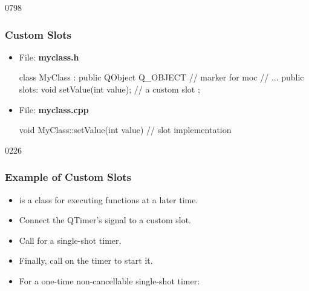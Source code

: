 
\begin{slide}[fragile]{0798}\frametitle{Custom Slots}
 \label{codeForSlots1}
\begin{itemize}
\item File: \textbf{myclass.h} 
  \begin{cpp}
class MyClass : public QObject 
{
  Q_OBJECT // marker for moc
  // ...
public slots:
  void setValue(int value); // a custom slot
};
  \end{cpp}
\item File: \textbf{myclass.cpp}
  \begin{cpp}
void MyClass::setValue(int value) {
  // slot implementation
}

  \end{cpp}
\end{itemize}
\end{slide}

\begin{slide}{0226}\frametitle{Example of Custom Slots}\label{qtimer}

\begin{itemize}
  \item {} is a class for executing functions at a later time.
  \item Connect the QTimer's signal  to a custom slot.
  \item Call  for a single-shot timer.
  \item Finally, call  on the timer to start it.
  \item For a one-time non-cancellable single-shot timer: 
  \end{itemize}


\end{slide}


